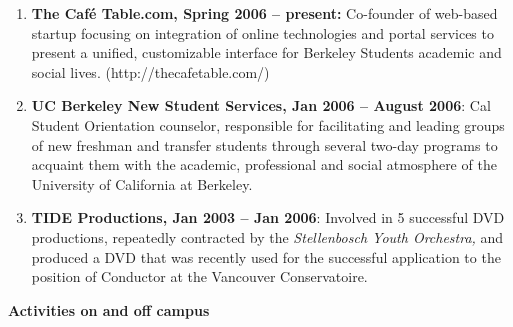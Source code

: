 \documentclass[12pt,twoside]{article}
\newcommand\liststyleWWviiiNumvi{%
\renewcommand\labelitemi{[F0A7?]}
\renewcommand\labelitemii{o}
\renewcommand\labelitemiii{[F0A7?]}
\renewcommand\labelitemiv{[F0B7?]}
}
\begin{document}
\liststyleWWviiiNumvi
\begin{enumerate}
\item {
\textsf{\textbf{The Caf\'e Table.com, Spring 2006 {--} present:
}}\textsf{\textmd{Co{}-founder of web{}-based startup focusing on
integration of online technologies and portal services to present a
unified, customizable interface for Berkeley Student{\textquotesingle}s
academic and social lives. (http://thecafetable.com/)}}}
\item {
\textsf{\textbf{UC Berkeley New Student Services, Jan 2006 {--} August
2006}}\textsf{: Cal Student Orientation counselor, responsible for
facilitating and leading groups of new freshman and transfer students
through several two{}-day programs to acquaint them with the academic,
professional and social atmosphere of the University of California at
Berkeley.}}
\item {
\textsf{\textbf{TIDE Productions, Jan 2003 {--} Jan 2006}}\textsf{:
Involved in 5 successful DVD productions, repeatedly contracted by the
}\textsf{\textit{Stellenbosch Youth Orchestra,}}\textsf{ and produced a
DVD that was recently used for the successful application to the
position of Conductor at the Vancouver Conservatoire.}}
\end{enumerate}

\bigskip


\bigskip


\bigskip

{\sffamily\bfseries
Activities on and off campus}
\end{document}
